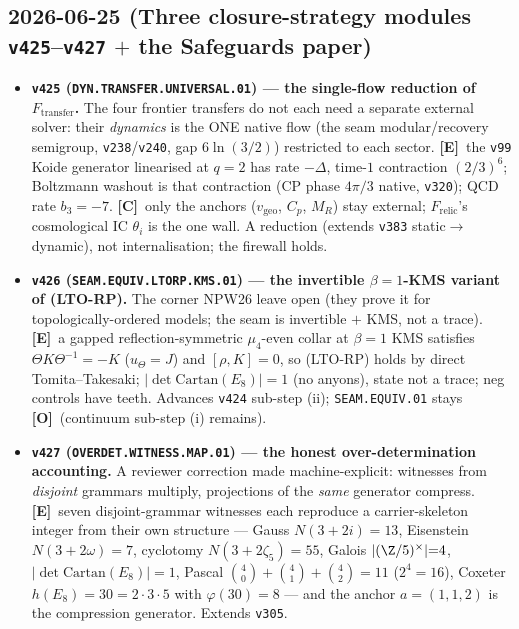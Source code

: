 \documentclass[11pt]{article}
\providecommand{\mE}{\textbf{[E]}}\providecommand{\mC}{\textbf{[C]}}
\providecommand{\mO}{\textbf{[O]}}\providecommand{\mX}{\textbf{[X]}}
\begin{document}
\subsection*{2026-06-25 (Three closure-strategy modules \texttt{v425}--\texttt{v427} $+$ the Safeguards paper)}
\begin{itemize}
\item \textbf{\texttt{v425} (\texttt{DYN.TRANSFER.UNIVERSAL.01}) --- the single-flow reduction of
$F_{\mathrm{transfer}}$.} The four frontier transfers do not each need a separate external solver: their
\emph{dynamics} is the ONE native flow (the seam modular/recovery semigroup, \texttt{v238}/\texttt{v240},
gap $6\ln(3/2)$) restricted to each sector. \mE\ the \texttt{v99} Koide generator linearised at $q{=}2$ has
rate $-\Delta$, time-$1$ contraction $(2/3)^6$; Boltzmann washout is that contraction (CP phase $4\pi/3$
native, \texttt{v320}); QCD rate $b_3{=}-7$. \mC\ only the anchors ($v_{\mathrm{geo}}$, $C_p$, $M_R$) stay
external; $F_{\mathrm{relic}}$'s cosmological IC $\theta_i$ is the one wall. A reduction (extends
\texttt{v383} static$\to$dynamic), not internalisation; the firewall holds.
\item \textbf{\texttt{v426} (\texttt{SEAM.EQUIV.LTORP.KMS.01}) --- the invertible $\beta{=}1$-KMS variant of
(LTO-RP).} The corner NPW26 leave open (they prove it for topologically-ordered models; the seam is
invertible $+$ KMS, not a trace). \mE\ a gapped reflection-symmetric $\mu_4$-even collar at $\beta{=}1$ KMS
satisfies $\Theta K\Theta^{-1}{=}{-}K$ ($u_\Theta{=}J$) and $[\rho,K]{=}0$, so (LTO-RP) holds by direct
Tomita--Takesaki; $|\!\det\mathrm{Cartan}(E_8)|{=}1$ (no anyons), state not a trace; neg controls have
teeth. Advances \texttt{v424} sub-step (ii); \texttt{SEAM.EQUIV.01} stays \mO\ (continuum sub-step (i)
remains).
\item \textbf{\texttt{v427} (\texttt{OVERDET.WITNESS.MAP.01}) --- the honest over-determination accounting.}
A reviewer correction made machine-explicit: witnesses from \emph{disjoint} grammars multiply, projections
of the \emph{same} generator compress. \mE\ seven disjoint-grammar witnesses each reproduce a
carrier-skeleton integer from their own structure --- Gauss $N(3{+}2i){=}13$, Eisenstein $N(3{+}2\omega){=}7$,
cyclotomy $N(3{+}2\zeta_5){=}55$, Galois $|(\Z/5)^\times|{=}4$, $|\!\det\mathrm{Cartan}(E_8)|{=}1$, Pascal
$\binom40{+}\binom41{+}\binom42{=}11$ ($2^4{=}16$), Coxeter $h(E_8){=}30{=}2{\cdot}3{\cdot}5$ with
$\varphi(30){=}8$ --- and the anchor $a{=}(1,1,2)$ is the compression generator. Extends \texttt{v305}.

\end{itemize}
\end{document}
